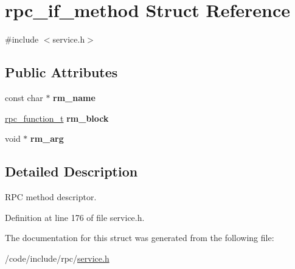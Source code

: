 \hypertarget{structrpc__if__method}{}\section{rpc\+\_\+if\+\_\+method Struct Reference}
\label{structrpc__if__method}


{\ttfamily \#include $<$service.\+h$>$}

\subsection*{Public Attributes}
\begin{DoxyCompactItemize}
\item 
const char $\ast$ {\bfseries rm\+\_\+name}\hypertarget{structrpc__if__method_a207409b75ef6c2cee361fb2ba4421c97}{}\label{structrpc__if__method_a207409b75ef6c2cee361fb2ba4421c97}

\item 
\hyperlink{service_8h_a02d3dbd723de9bd5140887c9935ff05a}{rpc\+\_\+function\+\_\+t} {\bfseries rm\+\_\+block}\hypertarget{structrpc__if__method_ad02bcfe0adc134947ab369c927e307a0}{}\label{structrpc__if__method_ad02bcfe0adc134947ab369c927e307a0}

\item 
void $\ast$ {\bfseries rm\+\_\+arg}\hypertarget{structrpc__if__method_a30f477ae1a1636164e2cc5051deb4fa1}{}\label{structrpc__if__method_a30f477ae1a1636164e2cc5051deb4fa1}

\end{DoxyCompactItemize}


\subsection{Detailed Description}
R\+PC method descriptor. 

Definition at line 176 of file service.\+h.



The documentation for this struct was generated from the following file\+:\begin{DoxyCompactItemize}
\item 
/code/include/rpc/\hyperlink{service_8h}{service.\+h}\end{DoxyCompactItemize}
